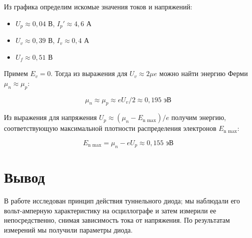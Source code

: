\documentclass[12pt]{kiarticle}
\begin{document}
	Из графика определим искомые значения токов и напряжений:
	
	\begin{itemize}
		\item $ U_p \approx 0,04 $ В, $ I_p' \approx 4,6 $ А
		\item $ U_v \approx 0,39 $ В, $ I_v \approx 0,4 $ А
		\item $ U_f \approx 0,51 $ В
	\end{itemize} 

Примем $E_v = 0$. Тогда из выражения для $U_v \approx 2\mu e$ можно найти энергию Ферми $\mu_n \approx \mu_p$:

\[ \mu_n \approx \mu_p \approx eU_v/2 \approx 0,195 \text{ эВ} \]

Из выражения для напряжения $U_p \approx (\mu_n - E_\text{n max})/e$ получим энергию, соответствующую максимальной плотности распределения электронов $E_\text{n max}$:

\[ E_\text{n max} = \mu_n - eU_p \approx 0,155 \text{ эВ} \] 
	
	\section{Вывод} 
	В работе исследован принцип действия туннельного диода; мы наблюдали его вольт-амперную характеристику на осциллографе и затем измерили ее непосредственно, снимая зависимость тока от напряжения. По результатам измерений мы получили параметры диода.
	
\end{document}

